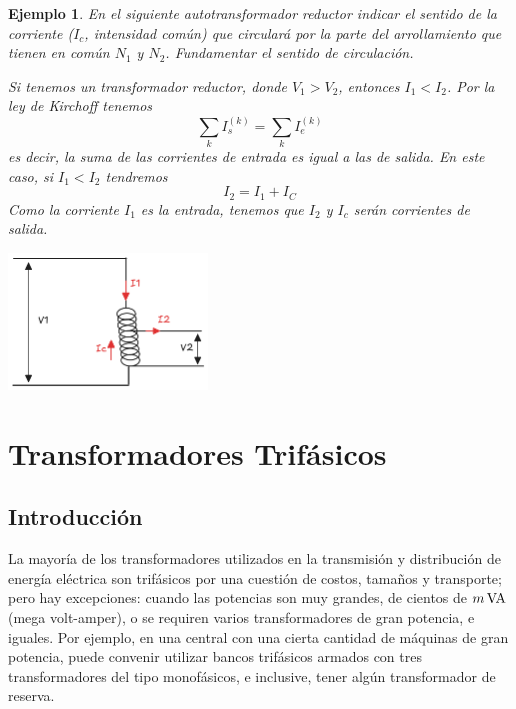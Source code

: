 \documentclass[11pt]{report}
\newtheorem{example}{Ejemplo}[section]
\begin{document}
\begin{example}
  En el siguiente autotransformador reductor indicar el sentido de la
  corriente ($I_c$, intensidad común) que circulará por la parte del
  arrollamiento que tienen en común $N_1$ y $N_2$. Fundamentar el sentido de
  circulación.

  Si tenemos un transformador reductor, donde $V_1 > V_2$, entonces $I_1
    < I_2$. Por la ley de Kirchoff tenemos
  \begin{equation}
    \sum_k I_s^{(k)} = \sum_k I_e^{(k)}
  \end{equation}
  es decir, la suma de las corrientes de entrada es igual a las de
  salida. En este caso, si $I_1 < I_2$ tendremos
  \begin{equation}
    I_2 = I_1 + I_C
  \end{equation}
  Como la corriente $I_1$ es la entrada, tenemos que $I_2$ y $I_c$ serán
  corrientes de salida.
  \begin{center}
    \includegraphics[width=200px]{ejemplo2.png}
  \end{center}
\end{example}

\chapter{Transformadores Trifásicos}

\section{Introducción}
La mayoría de los transformadores utilizados en la transmisión y distribución
de energía eléctrica
son trifásicos por una cuestión de costos, tamaños y transporte; pero hay
excepciones: cuando las
potencias son muy grandes, de cientos de $m\,{\textnormal{VA}}$ (mega
volt-amper), o se requiren varios transformadores
de gran potencia, e iguales. Por ejemplo, en una central con una cierta
cantidad de máquinas de gran potencia,
puede convenir utilizar bancos trifásicos armados con tres transformadores del
tipo monofásicos, e inclusive,
tener algún transformador de reserva.
\end{document}
